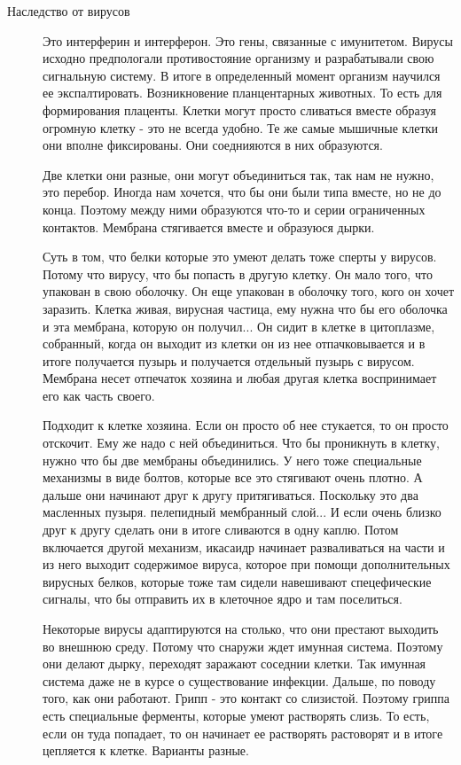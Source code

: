 \begin{description}
\item[Наследство от вирусов]
Это интерферин и интерферон. Это гены, связанные с имунитетом. Вирусы исходно 
предпологали противостояние организму и разрабатывали свою 
сигнальную систему. В итоге в определенный момент организм научился 
ее экспалтировать. Возникновение планцентарных животных. То есть 
для формирования плаценты. Клетки могут просто сливаться 
вместе образуя огромную клетку - это не всегда 
удобно. Те же самые мышичные клетки они вполне фиксированы. 
Они соеднияются в них образуются. 

Две клетки они разные, они могут объединиться так, так нам не нужно, 
это перебор. Иногда нам хочется, что бы 
они были типа вместе, но не до конца. Поэтому между  ними образуются 
что-то и серии ограниченных контактов. Мембрана стягивается 
вместе и образуюся дырки. 

Суть в том, что белки которые это умеют делать тоже сперты у вирусов. 
Потому что вирусу, что бы попасть в другую клетку. Он мало того, что 
упакован в свою оболочку. Он еще упакован в оболочку того, кого он хочет заразить. 
Клетка живая, вирусная частица, ему нужна что бы его оболочка и эта мембрана, 
которую он получил... Он сидит в клетке в цитоплазме, 
собранный, когда он выходит из клетки он из нее отпачковывается и 
в итоге получается пузырь и получается отдельный пузырь с вирусом. Мембрана несет отпечаток
хозяина и любая другая клетка воспринимает его как 
часть своего. 

Подходит к клетке хозяина. Если он просто об нее стукается, то он просто отскочит. Ему же
надо с ней объединиться. Что бы проникнуть в клетку, нужно что бы 
две мембраны объединились. У него тоже специальные механизмы в виде болтов, 
которые все это стягивают очень плотно. А дальше они начинают друг к другу притягиваться. 
Поскольку это два масленных пузыря. пелепидный мембранный слой... И если очень близко 
друг к другу сделать они в итоге сливаются в одну каплю. Потом включается 
другой механизм, икасаидр начинает 
разваливаться на части и из него выходит содержимое вируса, которое при помощи 
дополнительных вирусных 
белков, которые тоже там сидели навешивают спецефические сигналы, что 
бы отправить их в клеточное ядро и там поселиться. 

Некоторые вирусы адаптируются на столько, что они престают выходить во внешнюю
среду. Потому что снаружи ждет имунная система. Поэтому они делают дырку, переходят 
заражают соседнии клетки. Так имунная система даже не в курсе о существование инфекции. 
Дальше, по поводу того, как они работают. Грипп - это контакт со слизистой. Поэтому 
гриппа есть специальные ферменты, которые умеют растворять слизь. То есть, если 
он туда попадает, то он начинает ее растворять растоворят и в итоге цепляется к клетке. 
Варианты разные. 


\end{description}
